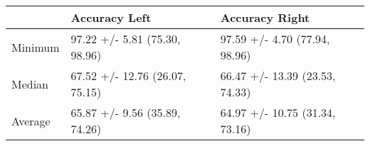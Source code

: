 \begin{tabular}{lll}
\toprule
{} &                   Accuracy Left &                  Accuracy Right \\
\midrule
Minimum &   97.22 +/- 5.81 (75.30, 98.96) &   97.59 +/- 4.70 (77.94, 98.96) \\
Median  &  67.52 +/- 12.76 (26.07, 75.15) &  66.47 +/- 13.39 (23.53, 74.33) \\
Average &   65.87 +/- 9.56 (35.89, 74.26) &  64.97 +/- 10.75 (31.34, 73.16) \\
\bottomrule
\end{tabular}
